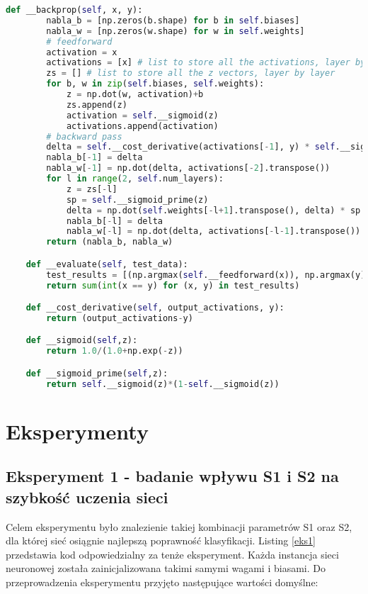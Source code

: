 \documentclass[12pt,twoside]{article}
\begin{document}
\begin{lstlisting}[language=Python,caption=Implementacja sieci,label={Kod2}]
    def __backprop(self, x, y):
        nabla_b = [np.zeros(b.shape) for b in self.biases]
        nabla_w = [np.zeros(w.shape) for w in self.weights]
        # feedforward
        activation = x
        activations = [x] # list to store all the activations, layer by layer
        zs = [] # list to store all the z vectors, layer by layer
        for b, w in zip(self.biases, self.weights):
            z = np.dot(w, activation)+b
            zs.append(z)
            activation = self.__sigmoid(z)
            activations.append(activation)
        # backward pass
        delta = self.__cost_derivative(activations[-1], y) * self.__sigmoid_prime(zs[-1])
        nabla_b[-1] = delta
        nabla_w[-1] = np.dot(delta, activations[-2].transpose())
        for l in range(2, self.num_layers):
            z = zs[-l]
            sp = self.__sigmoid_prime(z)
            delta = np.dot(self.weights[-l+1].transpose(), delta) * sp
            nabla_b[-l] = delta
            nabla_w[-l] = np.dot(delta, activations[-l-1].transpose())
        return (nabla_b, nabla_w)

    def __evaluate(self, test_data):
        test_results = [(np.argmax(self.__feedforward(x)), np.argmax(y)) for (x, y) in test_data]
        return sum(int(x == y) for (x, y) in test_results)

    def __cost_derivative(self, output_activations, y):
        return (output_activations-y)

    def __sigmoid(self,z):
        return 1.0/(1.0+np.exp(-z))

    def __sigmoid_prime(self,z):
        return self.__sigmoid(z)*(1-self.__sigmoid(z))


\end{lstlisting}
\clearpage

\section{Eksperymenty}


\subsection{Eksperyment 1 - badanie wpływu S1 i S2 na szybkość uczenia sieci}

Celem eksperymentu było znalezienie takiej kombinacji parametrów S1 oraz S2, dla której sieć osiągnie najlepszą poprawność klasyfikacji. Listing \ref{eks1} przedstawia kod odpowiedzialny za tenże eksperyment. Każda instancja sieci neuronowej została zainicjalizowana takimi samymi wagami i biasami. Do przeprowadzenia eksperymentu przyjęto następujące wartości domyślne:
\end{document}
